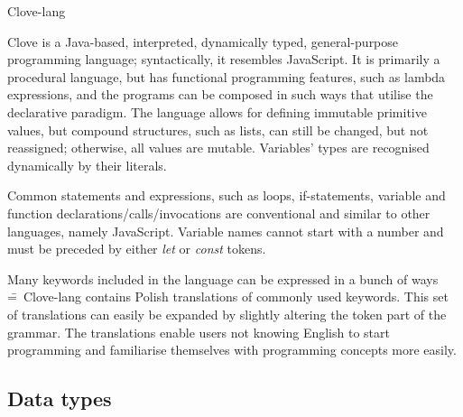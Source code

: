 \documentclass[12pt,a4paper]{article}
\begin{document}
\begin{center}
  \Huge {Clove-lang}
\end{center}

\noindent Clove is a Java-based, interpreted, dynamically typed, general-purpose programming language; syntactically, it resembles JavaScript. It is primarily a procedural language, but has functional programming features, such as lambda expressions, and the programs can be composed in such ways that utilise the declarative paradigm. The language allows for defining immutable primitive values, but compound structures, such as lists, can still be changed, but not reassigned; otherwise, all values are mutable. Variables' types are recognised dynamically by their literals.\par


Common statements and expressions, such as loops, if-statements, variable and function declarations/calls/invocations are conventional and similar to other languages, namely JavaScript. Variable names cannot start with a number and must be preceded by either \emph{let} or \emph{const} tokens.\par

Many keywords included in the language can be expressed in a bunch of ways \==~Clove-lang contains Polish translations of commonly used keywords. This set of translations can easily be expanded by slightly altering the token part of the grammar. The translations enable users not knowing English to start programming and familiarise themselves with programming concepts more easily.



\subsection*{Data types}

\end{document}
